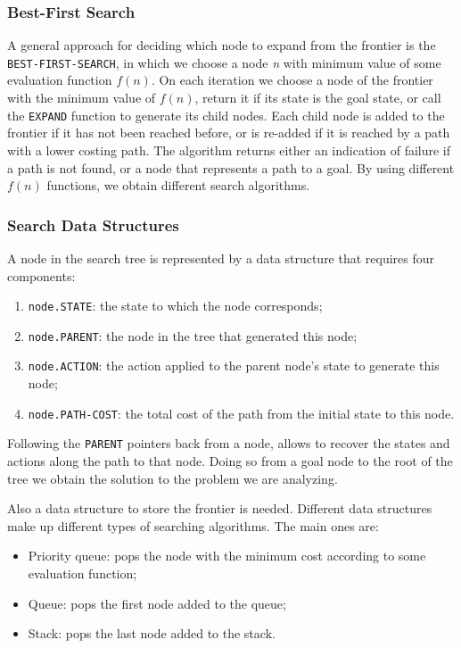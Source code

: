 \documentclass{article}
\begin{document}
\subsubsection{Best-First Search}
A general approach for deciding which node to expand from the frontier is the \lstinline{BEST-FIRST-SEARCH}, in which we choose a node \textit{n} with minimum value of some evaluation function \(f(n)\). On each iteration we choose a node of the frontier with the minimum value of \(f(n)\), return it if its state is the goal state, or call the \lstinline{EXPAND} function to generate its child nodes. Each child node is added to the frontier if it has not been reached before, or is re-added if it is reached by a path with a lower costing path. The algorithm returns either an indication of failure if a path is not found, or a node that represents a path to a goal. By using different \(f(n)\) functions, we obtain different search algorithms.

\subsubsection{Search Data Structures}
A node in the search tree is represented by a data structure that requires four components:
\begin{enumerate}
    \item \lstinline{node.STATE}: the state to which the node corresponds;
    \item \lstinline{node.PARENT}: the node in the tree that generated this node;
    \item \lstinline{node.ACTION}: the action applied to the parent node's state to generate this node;
    \item \lstinline{node.PATH-COST}: the total cost of the path from the initial state to this node.
\end{enumerate}

Following the \lstinline{PARENT} pointers back from a node, allows to recover the states and actions along the path to that node. Doing so from a goal node to the root of the tree we obtain the solution to the problem we are analyzing. 

Also a data structure to store the frontier is needed. Different data structures make up different types of searching algorithms. The main ones are:
\begin{itemize}
    \item Priority queue: pops the node with the minimum cost according to some evaluation function;
    \item Queue: pops the first node added to the queue;
    \item Stack: pops the last node added to the stack.
\end{itemize}
\end{document}
